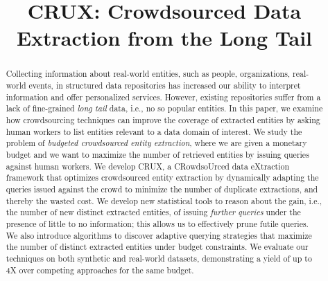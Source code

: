 \documentclass[conference]{IEEEtran}
\begin{document}

\title{CRUX: Crowdsourced Data Extraction from the Long Tail}

\author{
\and
{}
\and
{}
}

\maketitle

\begin{abstract}
Collecting information about real-world entities, such as people, organizations, real-world events, in structured data repositories has increased our ability to interpret information and offer personalized services. However, existing repositories suffer from a lack of fine-grained {\em long tail} data, i.e., no so popular entities. In this paper, we examine how crowdsourcing techniques can improve the coverage of extracted entities by asking human workers to list entities relevant to a data domain of interest. We study the problem of {\em budgeted crowdsourced entity extraction}, where we are given a monetary budget and we want to maximize the number of retrieved entities by issuing queries against human workers. We develop CRUX, a CRowdsoUrced data eXtraction framework that optimizes crowdsourced entity extraction by dynamically adapting the queries issued against the crowd to minimize the number of duplicate extractions, and thereby the wasted cost. We develop new statistical tools to reason about the gain, i.e., the number of new distinct extracted entities, of issuing {\em further queries} under the presence of little to no information; this allows us to effectively prune futile queries. We also introduce algorithms to discover adaptive querying strategies that maximize the number of distinct extracted entities under budget constraints. We evaluate our techniques on both synthetic and real-world datasets, demonstrating a yield of up to 4X over competing approaches for the same budget.
\end{abstract}
\end{document}
